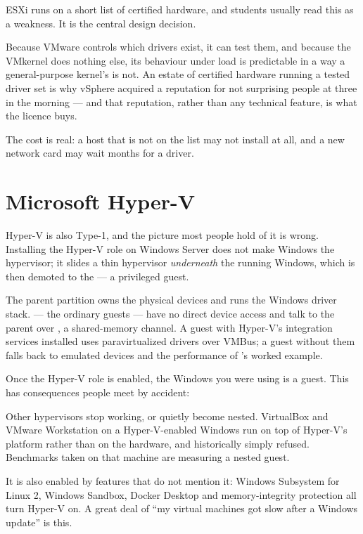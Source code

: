 \begin{conceptbox}
ESXi runs on a short list of certified hardware, and students usually read this
as a weakness. It is the central design decision.

\smallskip
Because VMware controls which drivers exist, it can test them, and because the
VMkernel does nothing else, its behaviour under load is predictable in a way a
general-purpose kernel's is not. An estate of certified hardware running a
tested driver set is why vSphere acquired a reputation for not surprising
people at three in the morning --- and that reputation, rather than any
technical feature, is what the licence buys.

\smallskip
The cost is real: a host that is not on the list may not install at all, and
a new network card may wait months for a driver.
\end{conceptbox}

\section{Microsoft Hyper-V}

Hyper-V is also Type-1, and the picture most people hold of it is wrong.
Installing the Hyper-V role on Windows Server does not make Windows the
hypervisor; it slides a thin hypervisor \emph{underneath} the running Windows,
which is then demoted to the  --- a privileged guest.

The parent partition owns the physical devices and runs the Windows driver
stack.  --- the ordinary guests --- have no direct device
access and talk to the parent over , a shared-memory channel. A
guest with Hyper-V's integration services installed uses 
paravirtualized drivers over VMBus; a guest without them falls back to emulated
devices and the performance of 's worked example.

\begin{alertbox}
Once the Hyper-V role is enabled, the Windows you were using is a guest. This
has consequences people meet by accident:

\smallskip
Other hypervisors stop working, or quietly become nested. VirtualBox and VMware
Workstation on a Hyper-V-enabled Windows run on top of Hyper-V's platform
rather than on the hardware, and historically simply refused. Benchmarks taken
on that machine are measuring a nested guest.

\smallskip
It is also enabled by features that do not mention it: Windows Subsystem for
Linux 2, Windows Sandbox, Docker Desktop and memory-integrity protection all
turn Hyper-V on. A great deal of ``my virtual machines got slow after a Windows
update'' is this.
\end{alertbox}

